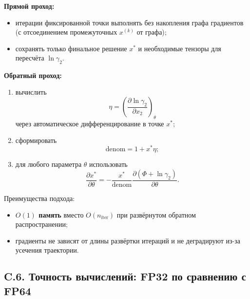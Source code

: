 \documentclass[11pt]{article}
\begin{document}
\textbf{Прямой проход:}
\begin{itemize}
  \item итерации фиксированной точки выполнять без накопления графа градиентов (с отсоединением промежуточных $x^{(k)}$ от графа);
  \item сохранять только финальное решение $x^*$ и необходимые тензоры для пересчёта $\ln\gamma_2$.
\end{itemize}

\textbf{Обратный проход:}
\begin{enumerate}
  \item вычислить
\begin{equation*}
\eta = \left(\frac{\partial \ln\gamma_2}{\partial x_2}\right)_{\theta}
\end{equation*}
через автоматическое дифференцирование в точке $x^*$;
  \item сформировать
\begin{equation*}
\mathrm{denom}=1+x^*\eta;
\end{equation*}
  \item для любого параметра $\theta$ использовать
\begin{equation*}
\frac{\partial x^*}{\partial \theta}
=
-\frac{x^*}{\mathrm{denom}}
\frac{\partial(\Phi+\ln\gamma_2)}{\partial\theta}.
\end{equation*}
\end{enumerate}

Преимущества подхода:
\begin{itemize}
  \item \textbf{$O(1)$ память} вместо $O(n_{\mathrm{iter}})$ при развёрнутом обратном распространении;
  \item градиенты не зависят от длины развёртки итераций и не деградируют из-за усечения траектории.
\end{itemize}

\subsection*{C.6. Точность вычислений: FP32 по сравнению с FP64}
\end{document}

